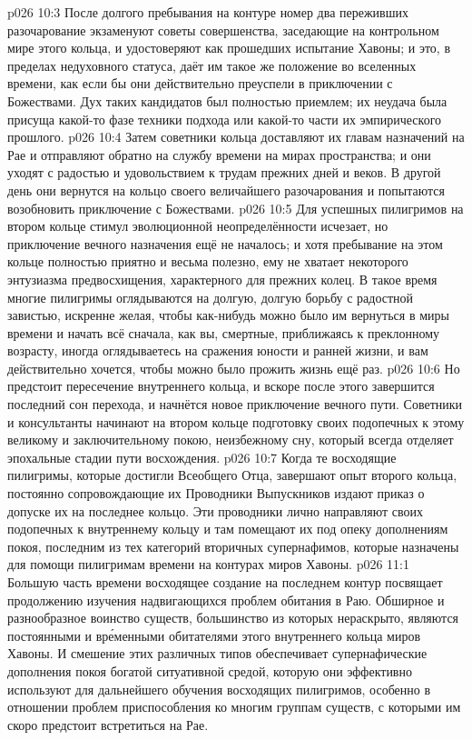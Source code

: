 \vs p026 10:3 После долгого пребывания на контуре номер два переживших разочарование экзаменуют советы совершенства, заседающие на контрольном мире этого кольца, и удостоверяют как прошедших испытание Хавоны; и это, в пределах недуховного статуса, даёт им такое же положение во вселенных времени, как если бы они действительно преуспели в приключении с Божествами. Дух таких кандидатов был полностью приемлем; их неудача была присуща какой\hyp{}то фазе техники подхода или какой\hyp{}то части их эмпирического прошлого.
\vs p026 10:4 Затем советники кольца доставляют их главам назначений на Рае и отправляют обратно на службу времени на мирах пространства; и они уходят с радостью и удовольствием к трудам прежних дней и веков. В другой день они вернутся на кольцо своего величайшего разочарования и попытаются возобновить приключение с Божествами.
\vs p026 10:5 Для успешных пилигримов на втором кольце стимул эволюционной неопределённости исчезает, но приключение вечного назначения ещё не началось; и хотя пребывание на этом кольце полностью приятно и весьма полезно, ему не хватает некоторого энтузиазма предвосхищения, характерного для прежних колец. В такое время многие пилигримы оглядываются на долгую, долгую борьбу с радостной завистью, искренне желая, чтобы как\hyp{}нибудь можно было им вернуться в миры времени и начать всё сначала, как вы, смертные, приближаясь к преклонному возрасту, иногда оглядываетесь на сражения юности и ранней жизни, и вам действительно хочется, чтобы можно было прожить жизнь ещё раз.
\vs p026 10:6 Но предстоит пересечение внутреннего кольца, и вскоре после этого завершится последний сон перехода, и начнётся новое приключение вечного пути. Советники и консультанты начинают на втором кольце подготовку своих подопечных к этому великому и заключительному покою, неизбежному сну, который всегда отделяет эпохальные стадии пути восхождения.
\vs p026 10:7 Когда те восходящие пилигримы, которые достигли Всеобщего Отца, завершают опыт второго кольца, постоянно сопровождающие их Проводники Выпускников издают приказ о допуске их на последнее кольцо. Эти проводники лично направляют своих подопечных к внутреннему кольцу и там помещают их под опеку дополнениям покоя, последним из тех категорий вторичных супернафимов, которые назначены для помощи пилигримам времени на контурах миров Хавоны.
\vs p026 11:1 Большую часть времени восходящее создание на последнем контур посвящает продолжению изучения надвигающихся проблем обитания в Раю. Обширное и разнообразное воинство существ, большинство из которых нераскрыто, являются постоянными и вр\'еменными обитателями этого внутреннего кольца миров Хавоны. И смешение этих различных типов обеспечивает супернафические дополнения покоя богатой ситуативной средой, которую они эффективно используют для дальнейшего обучения восходящих пилигримов, особенно в отношении проблем приспособления ко многим группам существ, с которыми им скоро предстоит встретиться на Рае.

